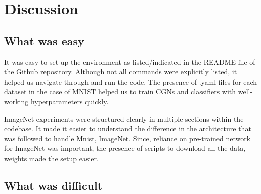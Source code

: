 \section{Discussion}
\subsection{What was easy}
It was easy to set up the environment as listed/indicated in the README file of the Github repository. Although not all commands were explicitly listed, it helped us navigate through and run the code. The presence of .yaml files for each dataset in the case of MNIST \cite{lecun1998gradient} helped us to train CGNs and classifiers with well-working hyperparameters quickly. 

ImageNet experiments were structured clearly in multiple sections within the codebase. It made it easier to understand the difference in the architecture that was followed to handle Mnist, ImageNet. Since, reliance on pre-trained network for ImageNet was important, the presence of scripts to download all the data, weights made the setup easier.

\subsection{What was difficult}


